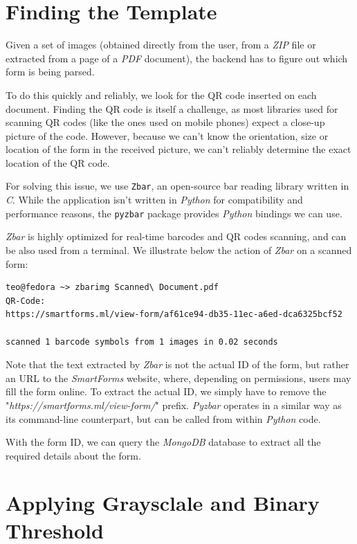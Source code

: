 \documentclass[11pt, a4paper]{report}
\def\code#1{\texttt{#1}}
\begin{document}
\section{Finding the Template}

Given a set of images (obtained directly from the user, from a \textit{ZIP} file or extracted from a page of a \textit{PDF} document), the backend has to figure out which form is being parsed.

To do this quickly and reliably, we look for the QR code inserted on each document. Finding the QR code is itself a challenge, as most libraries used for scanning QR codes (like the ones used on mobile phones) expect a close-up picture of the code. However, because we can't know the orientation, size or location of the form in the received picture, we can't reliably determine the exact location of the QR code.

For solving this issue, we use \code{Zbar}, an open-source bar reading library written in \textit{C}. While the application isn't written in \textit{Python} for compatibility and performance reasons, the \code{pyzbar} package provides \textit{Python} bindings we can use.

\textit{Zbar} is highly optimized for real-time barcodes and QR codes scanning, and can be also used from a terminal. We illustrate below the action of \textit{Zbar} on a scanned form:


\begin{verbatim}
teo@fedora ~> zbarimg Scanned\ Document.pdf 
QR-Code:
https://smartforms.ml/view-form/af61ce94-db35-11ec-a6ed-dca6325bcf52

scanned 1 barcode symbols from 1 images in 0.02 seconds
\end{verbatim}

Note that the text extracted by \textit{Zbar} is not the actual ID of the form, but rather an URL to the \textit{SmartForms} website, where, depending on permissions, users may fill the form online. To extract the actual ID, we simply have to remove the "\textit{https://smartforms.ml/view-form/}" prefix. \textit{Pyzbar} operates in a similar way as its command-line counterpart, but can be called from within \textit{Python} code.

With the form ID, we can query the \textit{MongoDB} database to extract all the required details about the form.

\section{Applying Graysclale and Binary Threshold}
\end{document}
